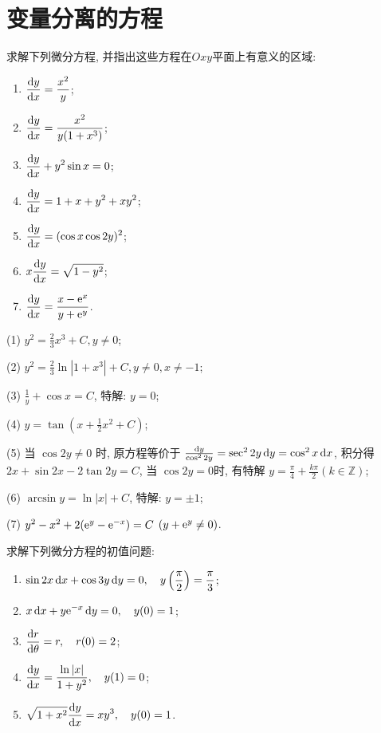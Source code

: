 \section{变量分离的方程}



\begin{exercise}
  求解下列微分方程, 并指出这些方程在$Oxy$平面上有意义的区域:
  \begin{enumerate}[(1)]
  \item $\displaystyle\frac{\mathop{}\!\mathrm{d} y}{\mathop{}\!\mathrm{d} x}=\frac{x^2}{y}$;
  \item $\displaystyle\frac{\mathop{}\!\mathrm{d} y}{\mathop{}\!\mathrm{d} x}=\frac{x^2}{y(1+x^3)}$;
  \item $\displaystyle\frac{\mathop{}\!\mathrm{d} y}{\mathop{}\!\mathrm{d} x}+y^2\sin x=0$;
  \item $\displaystyle\frac{\mathop{}\!\mathrm{d} y}{\mathop{}\!\mathrm{d} x}=1+x+y^2+xy^2$;
  \item $\displaystyle\frac{\mathop{}\!\mathrm{d} y}{\mathop{}\!\mathrm{d} x}=(\cos x\cos 2y)^2$;
  \item $\displaystyle x\frac{\mathop{}\!\mathrm{d} y}{\mathop{}\!\mathrm{d} x}=\sqrt{1-y^2}$;
  \item $\displaystyle\frac{\mathop{}\!\mathrm{d} y}{\mathop{}\!\mathrm{d} x}=\frac{x-\mathrm{e}^x}{y+\mathrm{e}^y}$.
  \end{enumerate}
\end{exercise}

\begin{solution}
  (1) $y^2=\frac{2}{3}x^3+C,y\neq 0$;

  (2) $y^2=\frac{2}{3}\ln|1+x^3|+C,y\neq0,x\neq-1$;

  (3) $\frac{1}{y}+\cos x=C$, 特解: $y=0$;

  (4) $y=\tan(x+\frac{1}{2}x^2+C)$;

  (5) 当 $\cos 2y\neq 0$ 时, 原方程等价于 $\frac{\mathop{}\!\mathrm{d} y}{\cos^2 2y}=\sec^2 2y\mathop{}\!\mathrm{d} y=\cos^2x\mathop{}\!\mathrm{d} x$, 
  积分得 $2x+\sin2x-2\tan2y=C$, 当 $\cos2y=0$时, 有特解 $y=\frac{\pi}{4}+\frac{k\pi}{2}(k\in\mathbb{Z})$;

  (6) $\arcsin y=\ln|x|+C$, 特解: $y=\pm 1$;

  (7) $y^2-x^2+2(\mathrm{e}^y-\mathrm{e}^{-x})=C$ $(y+\mathrm{e}^y\neq 0)$.
\end{solution}



\begin{exercise}
  求解下列微分方程的初值问题:
  \begin{enumerate}[(1)]
  \item $\displaystyle\sin 2x\mathop{}\!\mathrm{d} x+\cos 3y\mathop{}\!\mathrm{d} y=0,\quad y\left(\frac{\pi}{2}\right)=\frac{\pi}{3}$;
  \item $\displaystyle x\mathop{}\!\mathrm{d} x+y\mathrm{e}^{-x}\mathop{}\!\mathrm{d} y=0,\quad y(0)=1$;
  \item $\displaystyle\frac{\mathop{}\!\mathrm{d} r}{\mathop{}\!\mathrm{d}\theta}=r,\quad r(0)=2$;
  \item $\displaystyle\frac{\mathop{}\!\mathrm{d} y}{\mathop{}\!\mathrm{d} x}=\frac{\ln|x|}{1+y^2},\quad y(1)=0$;
  \item $\displaystyle\sqrt{1+x^2}\frac{\mathop{}\!\mathrm{d} y}{\mathop{}\!\mathrm{d} x}=xy^3,\quad y(0)=1$.
  \end{enumerate}
\end{exercise}

